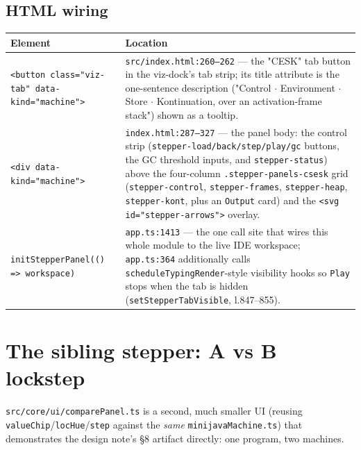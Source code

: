 \documentclass[11pt]{article}
\begin{document}
\subsection{HTML wiring}

\begin{center}
\begin{longtable}{@{}p{4.0cm}p{10.2cm}@{}}
\toprule
\textbf{Element} & \textbf{Location} \\
\midrule
\endhead
\texttt{<button class="viz-tab" data-kind="machine">} &
  \texttt{src/index.html:260--262} --- the "CESK" tab button in the
  viz-dock's tab strip; its title attribute is the one-sentence description
  ("Control $\cdot$ Environment $\cdot$ Store $\cdot$ Kontinuation, over an
  activation-frame stack") shown as a tooltip. \\
\texttt{<div data-kind="machine">} &
  \texttt{index.html:287--327} --- the panel body: the control strip
  (\texttt{stepper-load/back/step/play/gc} buttons, the GC threshold
  inputs, and \texttt{stepper-status}) above the four-column
  \texttt{.stepper-panels-csesk} grid (\texttt{stepper-control},
  \texttt{stepper-frames}, \texttt{stepper-heap}, \texttt{stepper-kont},
  plus an \texttt{Output} card) and the \texttt{<svg id="stepper-arrows">}
  overlay. \\
\texttt{initStepperPanel(() => workspace)} &
  \texttt{app.ts:1413} --- the one call site that wires this whole module
  to the live IDE workspace; \texttt{app.ts:364} additionally calls
  \texttt{scheduleTypingRender}-style visibility hooks so \texttt{Play}
  stops when the tab is hidden (\texttt{setStepperTabVisible}, l.847--855). \\
\bottomrule
\end{longtable}
\end{center}

\section{The sibling stepper: A vs B lockstep}
\label{sec:compare}

\texttt{src/core/ui/comparePanel.ts} is a second, much smaller UI
(reusing \texttt{valueChip}/\texttt{locHue}/\texttt{step} against the
\emph{same} \texttt{minijavaMachine.ts}) that demonstrates the design
note's \S8 artifact directly: one program, two machines.
\end{document}
